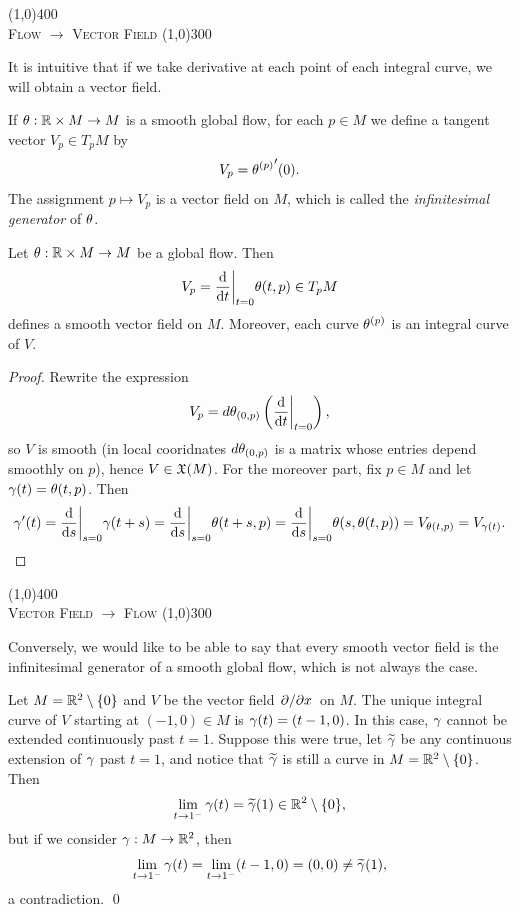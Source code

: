 \begin{center}
    \line(1,0){400} \\[7pt]
    {\Large \textsc{Flow $\to $ Vector Field}} 
    \line(1,0){300} \\[3pt]
\end{center}
It is intuitive that if we take derivative at each point of each integral curve, we will obtain a vector field. 
\begin{definition}
    If $\theta: \mathbb{R} \times M \to M$ is a smooth global flow, for each $p \in M$ we define a tangent vector $V_p \in T_pM$ by 
    $$V_p = {\theta^{(p)}} '(0). $$
    The assignment $p \mapsto V_p$ is a vector field on $M$, which is called the \textit{infinitesimal generator} of $\theta$. 
\end{definition}
\begin{proposition}
    Let $\theta:\mathbb{R} \times M \to M$ be a global flow. Then 
    $$V_p = \dv{}{t}\bigg|_{t=0} \theta(t,p) \in T_pM $$ defines a smooth vector field on $M$. Moreover, each curve $\theta^{(p)}$ is an integral curve of $V$. 
\end{proposition}
\begin{proof}
    Rewrite the expression
    $$V_p = d\theta_{(0,p)}\left(\dv{}{t}\bigg|_{t=0}\right), $$
    so $V$ is smooth (in local cooridnates $d\theta_{(0,p)}$ is a matrix whose entries depend smoothly on $p$), hence $V \in \frak{X}(M)$. For the moreover part, fix $p \in M$ and let $\gamma(t) = \theta(t,p)$. Then 
    $$\gamma'(t) = \dv{}{s}\bigg|_{s=0}\gamma(t+s)
    = \dv{}{s}\bigg|_{s=0} \theta(t+s,p) 
    = \dv{}{s}\bigg|_{s=0} \theta(s, \theta(t,p)) 
    = V_{\theta(t,p)} = V_{\gamma(t)}. $$
\end{proof}

\begin{center}
    \line(1,0){400} \\[7pt]
    {\Large \textsc{Vector Field $\to $ Flow}} 
    \line(1,0){300} \\[3pt]
\end{center}

Conversely, we would like to be able to say that every smooth vector field is the infinitesimal generator of a smooth global flow, which is not always the case. 
\begin{example}
    Let $M = \mathbb{R}^2 \setminus \{0\}$ and $V$ be the vector field $\pdv*{}{x}$ on $M$. The unique integral curve of $V$ starting at $(-1,0) \in M$ is $\gamma(t) = (t-1, 0)$. In this case, $\gamma$ cannot be extended continuously past $t=1$. Suppose this were true, let $\widetilde{\gamma}$ be any continuous extension of $\gamma$ past $t=1$, and notice that $\widetilde{\gamma}$ is still a curve in $M = \mathbb{R}^2 \setminus \{0\}$.  
    Then $$\lim_{t \to 1^-}\gamma(t) = \widetilde{\gamma}(1) \in \mathbb{R}^2 \setminus \{0\}, $$ 
    but if we consider $\gamma:M \to \mathbb{R}^2$, then 
    $$ \lim_{t \to 1^-}\gamma(t) = \lim_{t \to 1^-} (t-1, 0) = (0,0) \neq \widetilde{\gamma}(1), $$ a contradiction. \qed 
\end{example}

